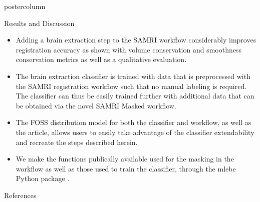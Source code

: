 \begin{frame}
\begin{columns}
\begin{column}{.59\textwidth}
\begin{beamercolorbox}[center]{postercolumn}
\begin{minipage}{.95\textwidth}
{                            \begin{myblock}{Results and Discussion}
                                \begin{itemize}
                                    \item Adding a brain extraction step to the SAMRI workflow considerably improves registration accuracy as shown with volume conservation and smoothness conservation metrics as well as a qualitative evaluation.
                                    \item The brain extraction classifier is trained with data that is preprocessed with the SAMRI registration workflow such that no manual labeling is required.
                                    The classifier can thus be easily trained further with additional data that can be obtained via the novel SAMRI Masked workflow.
                                    \item The FOSS distribution model \cite{repsep} for both the classifier and workflow, as well as the article, allows users to easily take advantage of the classifier extendability and recreate the steps described herein.
                                    \item We make the functions publically available used for the masking in the workflow as well as those used to train the classifier, through the \textcolor{mg}{mlebe} Python package \cite{mlebe}.

                                \end{itemize}
                            \end{myblock}\vfill

                            \begin{myblock}{References}
                                \vspace{-1em}
                                \begin{multicols}{2}
                                    \scriptsize
                                    
                                    
                                \end{multicols}
                                \vspace{-1em}
                            \end{myblock}\vfill


                        }
                    \end{minipage}
                \end{beamercolorbox}
            \end{column}

        \end{columns}
    \end{frame}

